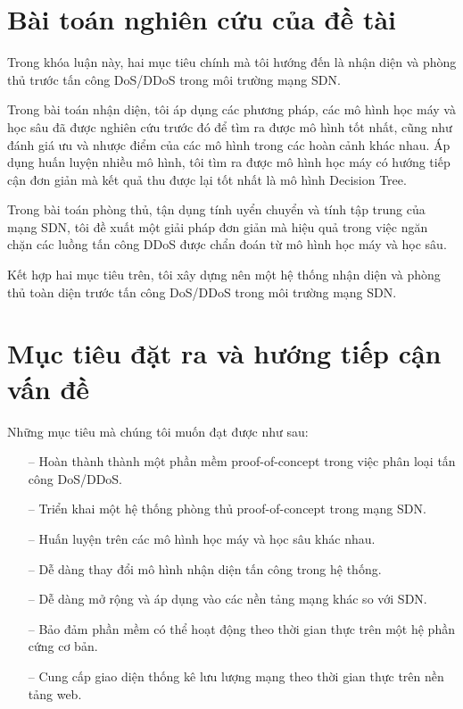 \section{Bài toán nghiên cứu của đề tài}

Trong khóa luận này, hai mục tiêu chính mà tôi hướng đến là nhận diện và phòng thủ trước tấn công DoS/DDoS trong môi trường mạng SDN.

Trong bài toán nhận diện, tôi áp dụng các phương pháp, các mô hình học máy và học sâu đã được nghiên cứu trước đó để tìm ra được mô hình tốt nhất, cũng như đánh giá ưu và nhược điểm của các mô hình trong các hoàn cảnh khác nhau. Áp dụng huấn luyện nhiều mô hình, tôi tìm ra được mô hình học  máy có hướng tiếp cận  đơn giản  mà kết quả thu được lại tốt nhất là mô hình Decision Tree.

Trong bài toán phòng thủ, tận dụng tính uyển chuyển và tính tập trung của mạng SDN, tôi đề xuất một giải pháp đơn giản mà hiệu quả trong việc ngăn chặn các luồng tấn công DDoS được chẩn đoán từ mô hình học  máy và học sâu.

Kết hợp hai mục tiêu trên, tôi xây dựng nên một hệ thống nhận diện và phòng thủ toàn diện trước tấn công DoS/DDoS trong môi trường mạng SDN.

\section{Mục tiêu đặt ra và hướng tiếp cận vấn đề}

Những mục tiêu mà chúng tôi muốn đạt được như sau:

\begin{itemize}
\item[--] Hoàn thành thành một phần mềm proof-of-concept trong việc phân loại tấn công DoS/DDoS.
\item[--] Triển khai một hệ thống phòng thủ proof-of-concept trong mạng SDN.
\item[--] Huấn luyện trên các mô hình học máy và học sâu khác nhau.
\item[--] Dễ dàng thay đổi mô hình nhận diện tấn công trong hệ thống.
\item[--] Dễ dàng mở rộng và áp dụng vào các nền tảng mạng khác so với SDN.
\item[--] Bảo đảm phần mềm có thể hoạt động theo thời gian thực trên một hệ phần cứng cơ bản.
\item[--] Cung cấp giao diện thống kê lưu lượng mạng theo thời gian thực trên nền tảng web.
\end{itemize}


